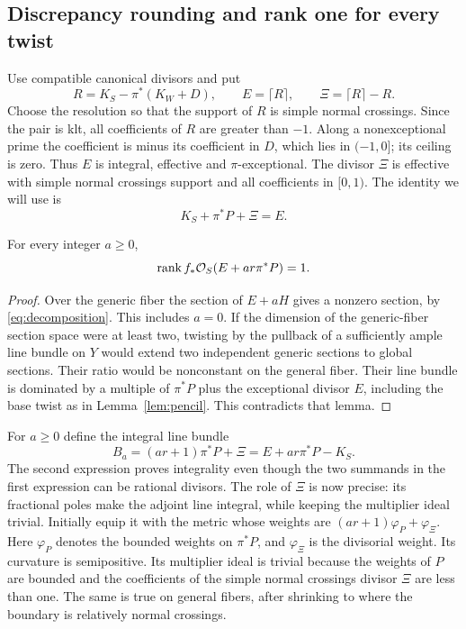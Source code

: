 \subsection{Discrepancy rounding and rank one for every twist}\label{subsec:rankone}

Use compatible canonical divisors and put
\begin{equation}\label{eq:rounding}
R=K_S-\pi^*(K_W+D),\qquad E=\lceil R\rceil,
\qquad\Xi=\lceil R\rceil-R.
\end{equation}
Choose the resolution so that the support of $R$ is simple normal crossings. Since the pair is klt, all coefficients of $R$ are greater than $-1$. Along a nonexceptional prime the coefficient is minus its coefficient in $D$, which lies in $(-1,0]$; its ceiling is zero. Thus $E$ is integral, effective and $\pi$-exceptional. The divisor $\Xi$ is effective with simple normal crossings support and all coefficients in $[0,1)$. The identity we will use is
\begin{equation}\label{eq:adjointidentity}
K_S+\pi^*P+\Xi=E.
\end{equation}

\begin{lemma}\label{lem:rankone}
For every integer $a\ge0$,
\[
\operatorname{rank} f_*\mathcal O_S(E+ar\pi^*P)=1.
\]
\end{lemma}
\begin{proof}
Over the generic fiber the section of $E+aH$ gives a nonzero section, by \eqref{eq:decomposition}. This includes $a=0$. If the dimension of the generic-fiber section space were at least two, twisting by the pullback of a sufficiently ample line bundle on $Y$ would extend two independent generic sections to global sections. Their ratio would be nonconstant on the general fiber. Their line bundle is dominated by a multiple of $\pi^*P$ plus the exceptional divisor $E$, including the base twist as in Lemma~\ref{lem:pencil}. This contradicts that lemma.
\end{proof}

For $a\ge0$ define the integral line bundle
\begin{equation}\label{eq:Ba}
B_a=(ar+1)\pi^*P+\Xi=E+ar\pi^*P-K_S.
\end{equation}
The second expression proves integrality even though the two summands in the first expression can be rational divisors. The role of $\Xi$ is now precise: its fractional poles make the adjoint line integral, while keeping the multiplier ideal trivial. Initially equip it with the metric whose weights are $(ar+1)\varphi_P+\varphi_\Xi$. Here $\varphi_P$ denotes the bounded weights on $\pi^*P$, and $\varphi_\Xi$ is the divisorial weight. Its curvature is semipositive. Its multiplier ideal is trivial because the weights of $P$ are bounded and the coefficients of the simple normal crossings divisor $\Xi$ are less than one. The same is true on general fibers, after shrinking to where the boundary is relatively normal crossings.

